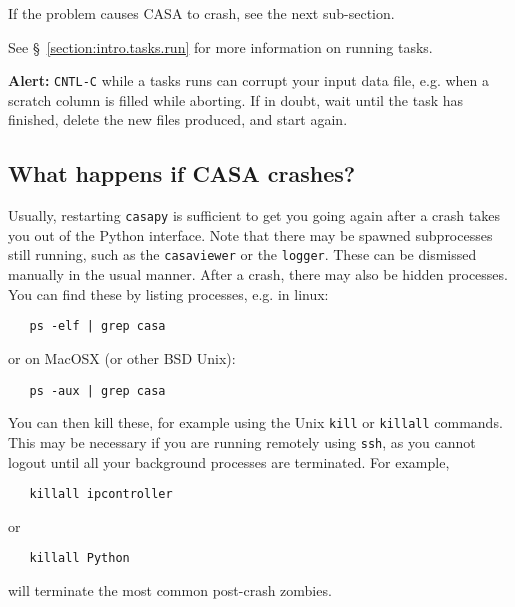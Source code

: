 If the problem causes CASA to crash, see the next sub-section.

See \S~\ref{section:intro.tasks.run} for more information on running
tasks.

{\bf Alert:} {\tt CNTL-C} while a tasks runs can corrupt your input
data file, e.g. when a scratch column is filled while aborting. If in
doubt, wait until the task has finished, delete the new files produced,
and start again. 



% 
% 
% 

\subsection{What happens if CASA crashes?}
\label{section:intro.basics.crash}

Usually, restarting {\tt casapy} is sufficient to get you going again
after a crash takes you out of the Python interface.  Note that there
may be spawned subprocesses still running, such as the 
{\tt casaviewer} or the {\tt logger}.  These can be dismissed manually
in the usual manner.  After a crash, there may also be hidden
processes.  You can find these by listing processes, e.g. in linux:
\small
\begin{verbatim}
   ps -elf | grep casa
\end{verbatim}
\normalsize
or on MacOSX (or other BSD Unix):
\small
\begin{verbatim}
   ps -aux | grep casa
\end{verbatim}
\normalsize
You can then kill these, for example using the Unix {\tt kill}
or {\tt killall} commands.  This may be necessary if you are running
remotely using {\tt ssh}, as you cannot logout until all your
background processes are terminated.  For example,
\small
\begin{verbatim}
   killall ipcontroller
\end{verbatim}
\normalsize
or
\small
\begin{verbatim}
   killall Python
\end{verbatim}
\normalsize
will terminate the most common post-crash zombies.

